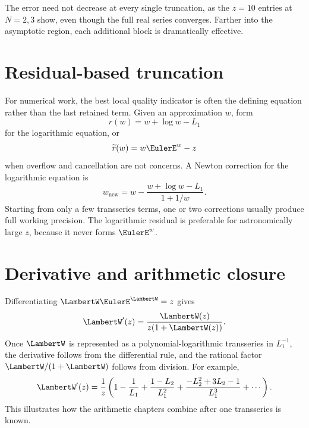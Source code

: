 \documentclass[11pt,oneside,openany]{book}
\begin{document}
The error need not decrease at every single truncation, as the \(z=10\) entries
at \(N=2,3\) show, even though the full real series converges.  Farther into
the asymptotic region, each additional block is dramatically effective.

\section{Residual-based truncation}
For numerical work, the best local quality indicator is often the defining
equation rather than the last retained term.  Given an approximation \(w\),
form
\begin{equation}\label{eq:Wresidual}
 r(w)=w+\log w-L_1
\end{equation}
for the logarithmic equation, or
\begin{equation}\label{eq:Wresidualexp}
 \widetilde r(w)=w\EulerE^w-z
\end{equation}
when overflow and cancellation are not concerns.  A Newton correction for the
logarithmic equation is
\begin{equation}\label{eq:Wnewtonlog}
 w_{\mathrm{new}}
 =w-\frac{w+\log w-L_1}{1+1/w}.
\end{equation}
Starting from only a few transseries terms, one or two corrections usually
produce full working precision.  The logarithmic residual is preferable for
astronomically large \(z\), because it never forms \(\EulerE^w\).

\section{Derivative and arithmetic closure}
Differentiating \(\LambertW\EulerE^\LambertW=z\) gives
\begin{equation}\label{eq:Wderivative}
 \LambertW'(z)=\frac{\LambertW(z)}{z(1+\LambertW(z))}.
\end{equation}
Once \(\LambertW\) is represented as a polynomial-logarithmic transseries in
\(L_1^{-1}\), the derivative follows from the differential rule, and the
rational factor \(\LambertW/(1+\LambertW)\) follows from division.  For example,
\begin{equation}\label{eq:Wderivativefirst}
 \LambertW'(z)=\frac1z\left(
 1-\frac1{L_1}+
 \frac{1-L_2}{L_1^2}+
 \frac{-L_2^2+3L_2-1}{L_1^3}
 +\cdots
 \right).
\end{equation}
This illustrates how the arithmetic chapters combine after one transseries is
known.
\end{document}
